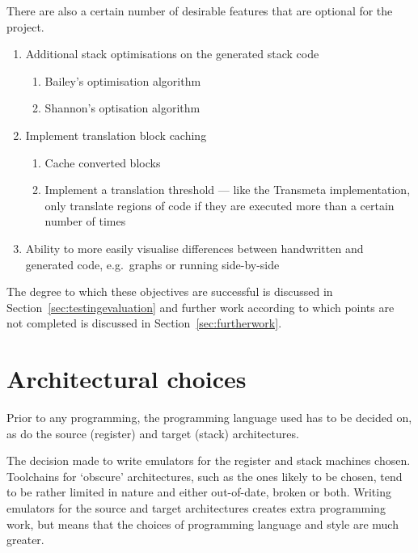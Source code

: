 \noindent There are also a certain number of desirable features that are
optional for the project.

\begin{enumerate}[noitemsep,resume,label=R\arabic*]
  \item Additional stack optimisations on the generated stack
    code\label{itm:moreoptimise}
  \begin{enumerate}[noitemsep,label=\theenumi.\arabic*]
    \item Bailey's optimisation algorithm~\cite{Bailey2000Inter}
    \item Shannon's optisation algorithm~\cite{Shannon2006AC}
  \end{enumerate}
  \item Implement translation block
    caching~\cite{TransmetaCodeMorph}\label{itm:caching}
  \begin{enumerate}[noitemsep,label=\theenumi.\arabic*]
    \item Cache converted blocks
    \item Implement a translation threshold --- like the Transmeta
      implementation, only translate regions of code if they are executed more
      than a certain number of times
  \end{enumerate}
  \item Ability to more easily visualise differences between handwritten and
    generated code, e.g.\ graphs or running side-by-side\label{itm:visualise}
\end{enumerate}

The degree to which these objectives are successful is discussed in
Section~\ref{sec:testingevaluation} and further work according to which points
are not completed is discussed in Section~\ref{sec:furtherwork}.

\section{Architectural choices}
Prior to any programming, the programming language used has to be decided on, as
do the source (register) and target (stack) architectures.

The decision made to write emulators for the register and stack machines chosen.
Toolchains for `obscure' architectures, such as the ones likely to be chosen,
tend to be rather limited in nature and either out-of-date, broken or both.
Writing emulators for the source and target architectures creates extra
programming work, but means that the choices of programming language and style
are much greater.

